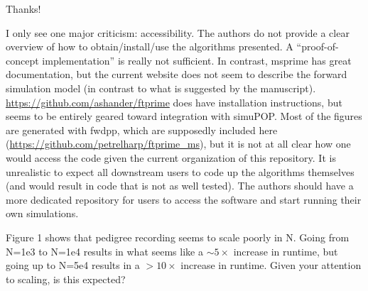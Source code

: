 Thanks!


\begin{point}{}
    I only see one major criticism: accessibility. The authors do not provide a
    clear overview of how to obtain/install/use the algorithms presented. A
    ``proof-of-concept implementation'' is really not sufficient. In contrast,
    msprime has great documentation, but the current website does not seem to
    describe the forward simulation model (in contrast to what is suggested by the
    manuscript). \url{https://github.com/ashander/ftprime} does have installation
    instructions, but seems to be entirely geared toward integration with simuPOP.
    Most of the figures are generated with fwdpp, which are supposedly included
    here (\url{https://github.com/petrelharp/ftprime_ms}), but it is not at all clear how
    one would access the code given the current organization of this repository. It
    is unrealistic to expect all downstream users to code up the algorithms
    themselves (and would result in code that is not as well tested). The authors
    should have a more dedicated repository for users to access the software and
    start running their own simulations.
\end{point}


\begin{point}{}
Figure 1 shows that pedigree recording seems to scale poorly in N. Going from
N=1e3 to N=1e4 results in what seems like a $\sim 5 \times$ increase in runtime, but going
up to N=5e4 results in a $> 10 \times$ increase in runtime. Given your attention to
scaling, is this expected?
\end{point}


